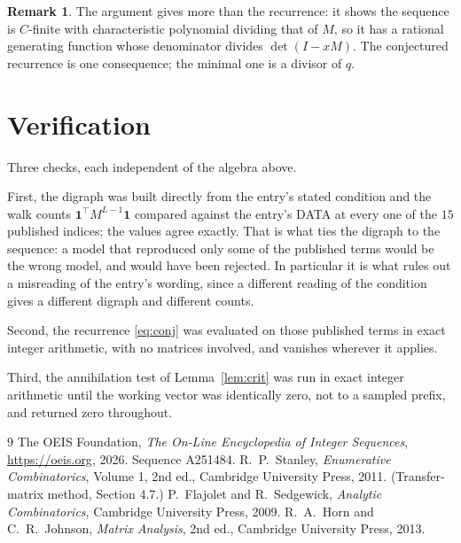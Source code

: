 \documentclass[11pt,a4paper]{article}
\theoremstyle{plain}
\theoremstyle{definition}
\newtheorem{remark}[theorem]{Remark}
\begin{document}
\begin{remark}
The argument gives more than the recurrence: it shows the sequence is $C$-finite with
characteristic polynomial dividing that of $M$, so it has a rational generating function
whose denominator divides $\det(I-xM)$. The conjectured recurrence is one consequence; the
minimal one is a divisor of $q$.
\end{remark}

\section{Verification}

Three checks, each independent of the algebra above.

First, the digraph was built directly from the entry's stated condition and the walk counts
$\mathbf{1}^{\!\top}M^{L-1}\mathbf{1}$ compared against the entry's DATA at
every one of the $15$ published indices; the values agree exactly. That is what ties
the digraph to the sequence: a model that reproduced only some of the published terms would
be the wrong model, and would have been rejected. In particular it is what rules out a
misreading of the entry's wording, since a different reading of the condition gives a
different digraph and different counts.

Second, the recurrence \eqref{eq:conj} was evaluated on those published terms in exact
integer arithmetic, with no matrices involved, and vanishes wherever it applies.

Third, the annihilation test of Lemma~\ref{lem:crit} was run in exact integer arithmetic
until the working vector was identically zero, not to a sampled prefix, and returned zero
throughout.

\begin{thebibliography}{9}
 The OEIS Foundation, \emph{The On-Line Encyclopedia of Integer
Sequences}, \url{https://oeis.org}, 2026. Sequence A251484.
 R.~P.~Stanley, \emph{Enumerative Combinatorics}, Volume 1, 2nd ed.,
Cambridge University Press, 2011. (Transfer-matrix method, Section 4.7.)
 P.~Flajolet and R.~Sedgewick, \emph{Analytic Combinatorics}, Cambridge
University Press, 2009.
 R.~A.~Horn and C.~R.~Johnson, \emph{Matrix Analysis}, 2nd ed., Cambridge
University Press, 2013.
\end{thebibliography}
\end{document}
